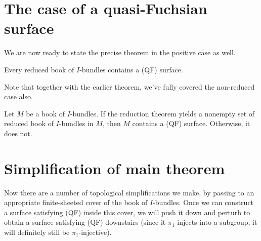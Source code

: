 \section{The case of a quasi-Fuchsian surface}

We are now ready to state the precise theorem in the positive case as well.

\begin{thm}

Every reduced book of $I$-bundles contains a (QF) surface.

\end{thm}

Note that together with the earlier theorem, we've fully covered the
non-reduced case also.

\begin{thm}

Let $M$ be a book of $I$-bundles. If the reduction theorem yields a nonempty
set of reduced book of $I$-bundles in $M$, then $M$ contains a (QF) surface.
Otherwise, it does not.

\end{thm}

\section{Simplification of main theorem}

Now there are a number of topological simplifications we make, by passing to an
appropriate finite-sheeted cover of the book of $I$-bundles.  Once we can
construct a surface satisfying (QF) inside this cover, we will push it down and
perturb to obtain a surface satisfying (QF) downstairs (since it
$\pi_1$-injects into a subgroup, it will definitely still be
$\pi_1$-injective).


